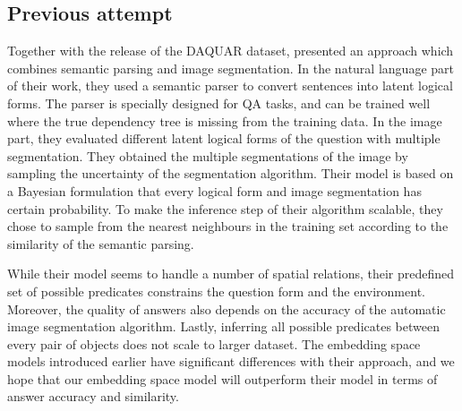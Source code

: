\subsection{Previous attempt}
Together with the release of the DAQUAR dataset, \cite{malinowski14b} presented an approach which combines semantic parsing and image segmentation. In the natural language part of their work, they used a semantic parser \cite{liang13} to convert sentences into latent logical forms. The parser is specially designed for QA tasks, and can be trained well where the true dependency tree is missing from the training data. In the image part, they evaluated different latent logical forms of the question with multiple segmentation. They obtained the multiple segmentations of the image by sampling the uncertainty of the segmentation algorithm. Their model is based on a Bayesian formulation that every logical form and image segmentation has certain probability. To make the inference step of their algorithm scalable, they chose to sample from the nearest neighbours in the training set according to the similarity of the semantic parsing.

While their model seems to handle a number of spatial relations, their predefined set of possible predicates constrains the question form and the environment. Moreover, the quality of answers also depends on the accuracy of the automatic image segmentation algorithm. Lastly, inferring all possible predicates between every pair of objects does not scale to larger dataset. The embedding space models introduced earlier have significant differences with their approach, and we hope that our embedding space model will outperform their model in terms of answer accuracy and similarity.